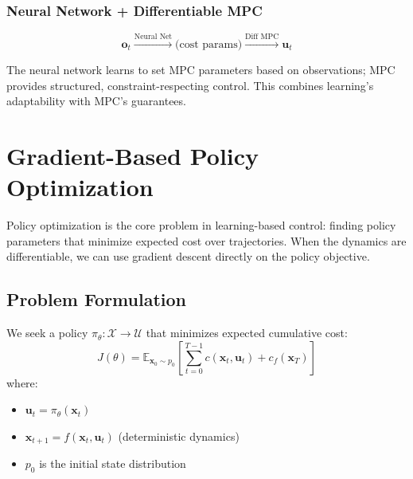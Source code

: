 \subsubsection{Neural Network + Differentiable MPC}

\begin{equation}
\mathbf{o}_t \xrightarrow{\text{Neural Net}} \text{(cost params)} \xrightarrow{\text{Diff MPC}} \mathbf{u}_t
\end{equation}

The neural network learns to set MPC parameters based on observations; MPC provides structured, constraint-respecting control. This combines learning's adaptability with MPC's guarantees.


\section{Gradient-Based Policy Optimization}
\label{sec:policy_optimization}

Policy optimization is the core problem in learning-based control: finding policy parameters that minimize expected cost over trajectories. When the dynamics are differentiable, we can use gradient descent directly on the policy objective.

\subsection{Problem Formulation}

We seek a policy $\pi_\theta: \mathcal{X} \to \mathcal{U}$ that minimizes expected cumulative cost:
\begin{equation}
J(\theta) = \mathbb{E}_{\mathbf{x}_0 \sim p_0}\left[ \sum_{t=0}^{T-1} c(\mathbf{x}_t, \mathbf{u}_t) + c_f(\mathbf{x}_T) \right]
\label{eq:policy_objective}
\end{equation}
where:
\begin{itemize}
    \item $\mathbf{u}_t = \pi_\theta(\mathbf{x}_t)$
    \item $\mathbf{x}_{t+1} = f(\mathbf{x}_t, \mathbf{u}_t)$ (deterministic dynamics)
    \item $p_0$ is the initial state distribution
\end{itemize}

